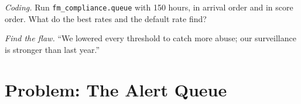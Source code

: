 \begin{exercise}[$\star\star\star$]\label{exo:fm:compliance-and-market-abuse:7}
\emph{Coding.} Run \texttt{fm\_compliance.queue} with 150 hours, in arrival order and in score order. What do the best rates and the default
rate find?
\end{exercise}

\begin{exercise}[$\star\star\star$]\label{exo:fm:compliance-and-market-abuse:8}
\emph{Find the flaw.} ``We lowered every threshold to catch more abuse; our surveillance is stronger than last year.''
\end{exercise}

\section{Problem: The Alert Queue}


